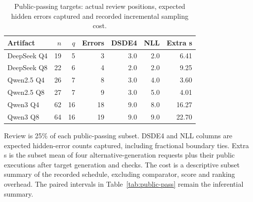 \begin{table}[htbp]
\centering
\caption{Public-passing targets: actual review positions, expected hidden errors captured and recorded incremental sampling cost.}
\label{tab:public-pass-decision}
\footnotesize
\begin{tabular}{lrrrrrr}
\toprule
Artifact & $n$ & $q$ & Errors & DSDE4 & NLL & Extra s \\
\midrule
DeepSeek Q4 & 19 & 5 & 3 & 3.0 & 2.0 & 6.41 \\
DeepSeek Q8 & 22 & 6 & 4 & 2.0 & 2.0 & 9.25 \\
Qwen2.5 Q4 & 26 & 7 & 8 & 3.0 & 4.0 & 3.60 \\
Qwen2.5 Q8 & 27 & 7 & 9 & 3.0 & 5.0 & 4.01 \\
Qwen3 Q4 & 62 & 16 & 18 & 9.0 & 8.0 & 16.27 \\
Qwen3 Q8 & 64 & 16 & 19 & 9.0 & 9.0 & 22.70 \\
\bottomrule
\end{tabular}
\par\vspace{4pt}\begin{minipage}{0.98\linewidth}\footnotesize Review is 25\% of each public-passing subset. DSDE4 and NLL columns are expected hidden-error counts captured, including fractional boundary ties. Extra s is the subset mean of four alternative-generation requests plus their public executions after target generation and checks. The cost is a descriptive subset summary of the recorded schedule, excluding comparator, score and ranking overhead. The paired intervals in Table~\ref{tab:public-pass} remain the inferential summary.\end{minipage}
\end{table}
